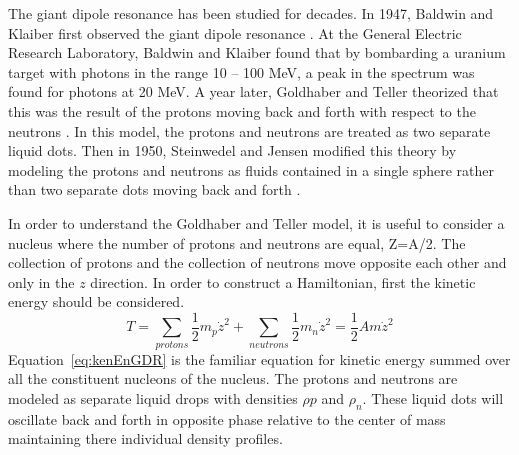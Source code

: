     The giant dipole resonance has been studied for decades.
    In 1947, Baldwin and Klaiber first observed the giant dipole resonance \cite{emPCite6}.
    At the General Electric Research Laboratory, Baldwin and Klaiber found that
      by bombarding a uranium target with photons in the range 10 – 100 MeV, a 
      peak in the spectrum was found for photons at 20 MeV.
    A year later, Goldhaber and Teller theorized that this was the result of 
      the protons moving back and forth with respect to the neutrons \cite{emPCite6}.
    In this model, the protons and neutrons are treated as two separate liquid 
      dots.
    Then in 1950, Steinwedel and Jensen modified this theory by modeling the 
      protons and neutrons as fluids contained in a single sphere rather than 
      two separate dots moving back and forth \cite{emPCite6}.
    
    In order to understand the Goldhaber and Teller model, it is useful to 
      consider a nucleus where the number of protons and neutrons are equal, 
      Z=A/2.
    The collection of protons and the collection of neutrons move opposite each
      other and only in the $z$ direction.
    In order to construct a Hamiltonian, first the kinetic energy should be 
      considered.
    \begin{equation}
      T=\sum_{protons} \frac{1}{2}m_{p}\dot{z}^{2} +\sum_{neutrons}\frac{1}{2}m_{n}\dot{z}^{2}=
        \frac{1}{2}Am\dot{z}^{2}
      \label{eq:kenEnGDR}
    \end{equation}
    Equation~\ref{eq:kenEnGDR} is the familiar equation for kinetic energy 
      summed over all the constituent nucleons of the nucleus.
    The protons and neutrons are modeled as separate liquid drops with 
    densities $\rho{p}$ and  $\rho_{n}$.
    These liquid dots will oscillate back and forth in opposite phase relative 
      to the center of mass maintaining there individual density profiles.
    
